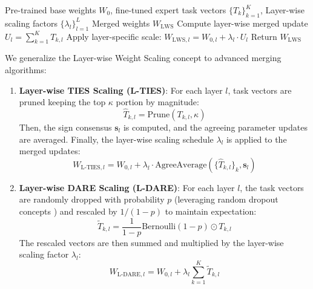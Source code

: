 \documentclass{article}
\theoremstyle{plain}
\theoremstyle{definition}
\theoremstyle{remark}
\begin{document}
\begin{algorithm}[tb]
  \caption{Layer-wise Weight Scaling (LWS)}
  \label{alg:lws}
  \begin{algorithmic}
     Pre-trained base weights $W_0$, fine-tuned expert task vectors $\{T_k\}_{k=1}^K$, Layer-wise scaling factors $\{\lambda_l\}_{l=1}^L$
     Merged weights $W_{\text{LWS}}$
    \STATE Compute layer-wise merged update $U_l = \sum_{k=1}^K T_{k,l}$
    \STATE Apply layer-specific scale:
    \STATE $W_{\text{LWS}, l} = W_{0,l} + \lambda_l \cdot U_l$
    \ENDFOR
    \STATE Return $W_{\text{LWS}}$
  \end{algorithmic}
\end{algorithm}

We generalize the Layer-wise Weight Scaling concept to advanced merging algorithms:
\begin{enumerate}
    \item \textbf{Layer-wise TIES Scaling (L-TIES)}: For each layer $l$, task vectors are pruned keeping the top $\kappa$ portion by magnitude:
    \begin{equation}
        \hat{T}_{k,l} = \text{Prune}(T_{k,l}, \kappa)
    \end{equation}
    Then, the sign consensus $\mathbf{s}_l$ is computed, and the agreeing parameter updates are averaged. Finally, the layer-wise scaling schedule $\lambda_l$ is applied to the merged updates:
    \begin{equation}
        W_{\text{L-TIES}, l} = W_{0,l} + \lambda_l \cdot \text{AgreeAverage}(\{\hat{T}_{k,l}\}_k, \mathbf{s}_l)
    \end{equation}
    \item \textbf{Layer-wise DARE Scaling (L-DARE)}: For each layer $l$, the task vectors are randomly dropped with probability $p$ (leveraging random dropout concepts \cite{dropout}) and rescaled by $1/(1-p)$ to maintain expectation:
    \begin{equation}
        \tilde{T}_{k,l} = \frac{1}{1-p} \text{Bernoulli}(1-p) \odot T_{k,l}
    \end{equation}
    The rescaled vectors are then summed and multiplied by the layer-wise scaling factor $\lambda_l$:
    \begin{equation}
        W_{\text{L-DARE}, l} = W_{0,l} + \lambda_l \sum_{k=1}^K \tilde{T}_{k,l}
    \end{equation}
\end{enumerate}
\end{document}
